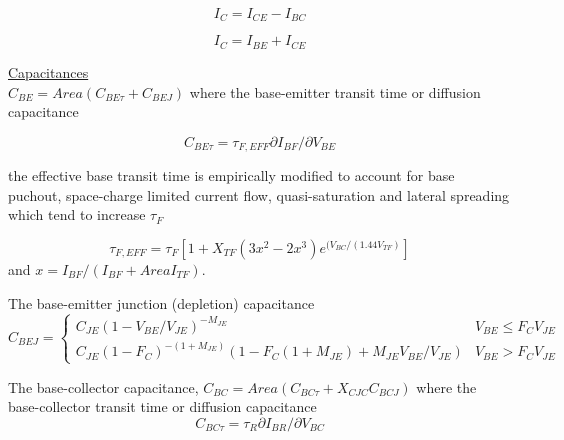 \documentclass{article}
\begin{document}
\begin{equation}
I_C = I_{CE}-I_{BC}
\end{equation}

\begin{equation}
I_C = I_{BE}+I_{CE}
\end{equation}

\noindent\underline{\large Capacitances}\\

$C_{BE} = Area( C_{BE\tau} + C_{BEJ})$
where the base-emitter transit time or diffusion capacitance

\begin{equation}
C_{BE\tau} = \tau_{F,EFF} {{\textstyle\partial I_{BF}} /
       {\textstyle\partial V_{BE}}}
\end{equation}

the effective base transit time is empirically modified to account for base
puchout, space-charge limited current flow, quasi-saturation and lateral
spreading which tend to increase $\tau_F$

\begin{equation}
\tau_{F,EFF} =\tau_F\left[ 1+X_{TF}(3x^2-2x^3)
     e^{\textstyle (V_{BC}/(1.44V_{TF})}\right]
\end{equation}
and $x = {I_{BF}}/(I_{BF} + Area I_{TF})$.


The base-emitter junction (depletion) capacitance
\begin{equation}
C_{BEJ} = \left\{ \!\! \begin{array}{ll}
C_{JE} \left(1-{{\textstyle V_{BE}} / {\textstyle V_{JE}}}\right)^{\textstyle -M_{JE}} & \! V_{BE} \le F_C V_{JE}\\
C_{JE} \left(1-F_C\right)^{\textstyle -(1+M_{JE})} \left(1-F_C(1+M_{JE})+M_{JE}{{\textstyle V_{BE}} / {\textstyle V_{JE}}} \right) & \! V_{BE} > F_C V_{JE}
                         \end{array}
         \right.
\end{equation}


The base-collector capacitance,
$C_{BC} = Area(C_{BC\tau} +X_{CJC} C_{BCJ})$
where the base-collector transit time or diffusion capacitance
\begin{equation}
C_{BC\tau} = \tau_R {{\textstyle\partial I_{BR}} /
       {\textstyle\partial V_{BC}}}
\end{equation}
\end{document}
